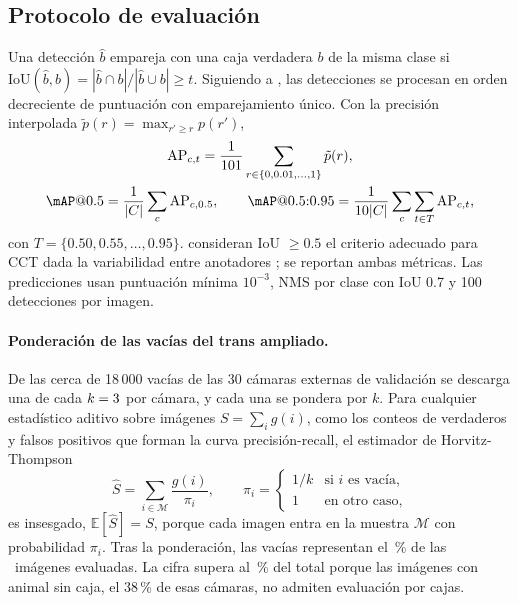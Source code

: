 \documentclass{article}
\newcommand{\IoU}{\mathrm{IoU}}
\begin{document}
\subsection{Protocolo de evaluación}
\label{sec:evaluacion}
Una detección \(\hat{b}\) empareja con una caja verdadera \(b\) de la misma clase si \(\IoU(\hat{b}, b) = |\hat{b} \cap b|/|\hat{b} \cup b| \ge t\). Siguiendo a \textcite{lin2014coco}, las detecciones se procesan en orden decreciente de puntuación con emparejamiento único. Con la precisión interpolada \(\tilde{p}(r) = \max_{r' \ge r} p(r')\),
\begin{equation}
  \begin{gathered}
  \mathrm{AP}_{c,t} = \frac{1}{101} \sum_{r \in \{0, 0.01, \dots, 1\}} \tilde{p}(r), \\
  \mAP@0.5 = \frac{1}{|C|}\sum_{c} \mathrm{AP}_{c,0.5}, \qquad
  \mAP@0.5{:}0.95 = \frac{1}{10|C|}\sum_{c}\sum_{t\in T} \mathrm{AP}_{c,t},
  \end{gathered}
  \label{eq:map}
\end{equation}
con \(T = \{0.50, 0.55, \dots, 0.95\}\). \Textcite{beery2018} consideran IoU \(\ge 0.5\) el criterio adecuado para CCT dada la variabilidad entre anotadores \parencite{everingham2010}; se reportan ambas métricas. Las predicciones usan puntuación mínima \(10^{-3}\), NMS por clase con IoU 0.7 y 100 detecciones por imagen.

\paragraph{Ponderación de las vacías del trans ampliado.} De las cerca de 18\,000 vacías de las 30 cámaras externas de validación se descarga una de cada \(k = 3\) por cámara, y cada una se pondera por \(k\). Para cualquier estadístico aditivo sobre imágenes \(S = \sum_i g(i)\), como los conteos de verdaderos y falsos positivos que forman la curva precisión-recall, el estimador de Horvitz-Thompson
\begin{equation}
  \hat{S} = \sum_{i \in \mathcal{M}} \frac{g(i)}{\pi_i}, \qquad \pi_i = \begin{cases} 1/k & \text{si } i \text{ es vacía},\\ 1 & \text{en otro caso},\end{cases}
  \label{eq:ht}
\end{equation}
es insesgado, \(\mathbb{E}[\hat S] = S\), porque cada imagen entra en la muestra \(\mathcal{M}\) con probabilidad \(\pi_i\). Tras la ponderación, las vacías representan el \pctVaciasExtPond\,\% de las \nTransExt\ imágenes evaluadas. La cifra supera al \pctVaciasExtVal\,\% del total porque las imágenes con animal sin caja, el 38\,\% de esas cámaras, no admiten evaluación por cajas.
\end{document}
